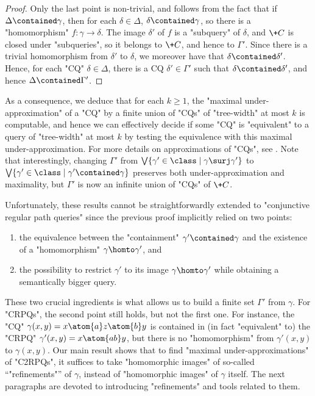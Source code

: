 \begin{proof}
Only the last point is non-trivial, and follows from the fact that if
$\Delta \contained \gamma$, then for each $\delta \in \Delta$, $\delta \contained \gamma$,
so there is a "homomorphism" $f\colon \gamma \to \delta$. The image $\delta'$
of $f$ is a "subquery" of $\delta$, and $\+C$ is closed under "subqueries",
so it belongs to $\+C$, and hence to $\Gamma'$. Since there is a trivial homomorphism
from $\delta'$ to $\delta$, we moreover have that $\delta \contained \delta'$.
Hence, for each "CQ" $\delta \in \Delta$, there is a CQ $\delta' \in \Gamma'$ such
that $\delta \contained \delta'$, and hence $\Delta \contained \Gamma'$.
\end{proof}

As a consequence, we deduce that for each $k \geq 1$,
the "maximal under-approximation" of a "CQ" by
a finite union of "CQs" of "tree-width" at most $k$ is computable, and hence
we can effectively decide if some "CQ" is "equivalent" to a query of "tree-width" at
most $k$ by testing the equivalence with this maximal under-approximation.
For more details on approximations of "CQs", see \cite{DBLP:journals/siamcomp/BarceloL014}.
Note that interestingly, changing $\Gamma'$ from
$\bigvee \{ \gamma' \in \class \mid \gamma \surj \gamma' \}$
to $\bigvee \{ \gamma' \in \class \mid \gamma' \contained \gamma \}$
preserves both under-approximation and maximality, but $\Gamma'$ is now an infinite
union of "CQs" of $\+C$.

Unfortunately, these results cannot be straightforwardly extended to "conjunctive regular
path queries" since the previous proof implicitly relied on two points:
\begin{enumerate}
	\item the equivalence between the
	"containment" $\gamma' \contained \gamma$ and the existence of a "homomorphism"
	$\gamma \homto \gamma'$, and
	\item the possibility to restrict $\gamma'$ to its image $\gamma \homto \gamma'$ while 
	obtaining a semantically bigger query.
\end{enumerate}
These two crucial ingredients is what allows us to build a finite set $\Gamma'$ from $\gamma$.
For "CRPQs", the second point still holds, but not the first one.
For instance, the "CQ" $\gamma(x,y) = x \atom{a} z \atom{b} y$ is
contained in (in fact "equivalent" to) the "CRPQ" $\gamma'(x,y) = x \atom{ab} y$,
but there is no "homomorphism" from $\gamma'(x,y)$ to $\gamma(x,y)$.
Our main result shows that to find "maximal under-approximations" of "C2RPQs",
it suffices to take "homomorphic images" of so-called ``"refinements"'' of $\gamma$,
instead of "homomorphic images" of $\gamma$ itself. The next paragraphs are devoted to
introducing "refinements" and tools related to them.

